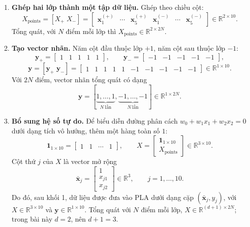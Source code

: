 \begin{enumerate}
  
  \textsf{X0 = class0.T} và \textsf{X1 = class1.T} tạo
  \[
  X_{+}=C_{+}^{T}=
  \begin{bmatrix}
  \vert & \vert & & \vert\\
  \mathbf{x}_1^{(+)} & \mathbf{x}_2^{(+)} & \cdots & \mathbf{x}_5^{(+)}\\
  \vert & \vert & & \vert
  \end{bmatrix}\in\mathbb{R}^{2\times 5},
  \qquad
  X_{-}=C_{-}^{T}\in\mathbb{R}^{2\times 5}.
  \]
  Vì vậy, điểm thứ \(i\) được truy cập bằng cột thứ \(i\) của ma trận tương ứng.

  \item \textbf{Ghép hai lớp thành một tập dữ liệu.} Ghép theo chiều cột:
  \[
  X_{\mathrm{points}}=[X_{+}\;X_{-}]
  =
  \begin{bmatrix}
  \mathbf{x}_1^{(+)} & \cdots & \mathbf{x}_5^{(+)} &
  \mathbf{x}_1^{(-)} & \cdots & \mathbf{x}_5^{(-)}
  \end{bmatrix}
  \in\mathbb{R}^{2\times 10}.
  \]
  Tổng quát, với \(N\) điểm mỗi lớp thì
  \(X_{\mathrm{points}}\in\mathbb{R}^{2\times 2N}\).

  \item \textbf{Tạo vector nhãn.} Năm cột đầu thuộc lớp \(+1\), năm cột sau thuộc lớp \(-1\):
  \[
  \mathbf{y}_{+}=\begin{bmatrix}1&1&1&1&1\end{bmatrix},
  \qquad
  \mathbf{y}_{-}=\begin{bmatrix}-1&-1&-1&-1&-1\end{bmatrix},
  \]
  \[
  \mathbf{y}=[\mathbf{y}_{+}\;\mathbf{y}_{-}]
  =
  \begin{bmatrix}1&1&1&1&1&-1&-1&-1&-1&-1\end{bmatrix}
  \in\mathbb{R}^{1\times 10}.
  \]
  Với \(2N\) điểm, vector nhãn tổng quát có dạng
  \[
  \mathbf{y}=
  \left[
  \underbrace{1,\ldots,1}_{N\ \text{lần}},
  \underbrace{-1,\ldots,-1}_{N\ \text{lần}}
  \right]
  \in\mathbb{R}^{1\times 2N}.
  \]

  \item \textbf{Bổ sung hệ số tự do.} Để biểu diễn đường phân cách
  \(w_0+w_1x_1+w_2x_2=0\) dưới dạng tích vô hướng, thêm một hàng toàn số \(1\):
  \[
  \mathbf{1}_{1\times 10}=\begin{bmatrix}1&1&\cdots&1\end{bmatrix},
  \qquad
  X=
  \begin{bmatrix}
  \mathbf{1}_{1\times 10}\\
  X_{\mathrm{points}}
  \end{bmatrix}
  \in\mathbb{R}^{3\times 10}.
  \]
  Cột thứ \(j\) của \(X\) là vector mở rộng
  \[
  \bar{\mathbf{x}}_j=
  \begin{bmatrix}1\\x_{j1}\\x_{j2}\end{bmatrix}
  \in\mathbb{R}^{3},
  \qquad j=1,\ldots,10.
  \]
  Do đó, sau khối 1, dữ liệu được đưa vào PLA dưới dạng cặp
  \((\bar{\mathbf{x}}_j,y_j)\), với \(X\in\mathbb{R}^{3\times 10}\) và
  \(\mathbf{y}\in\mathbb{R}^{1\times 10}\). Tổng quát với \(N\) điểm mỗi lớp,
  \(X\in\mathbb{R}^{(d+1)\times 2N}\); trong bài này \(d=2\), nên \(d+1=3\).
\end{enumerate}

